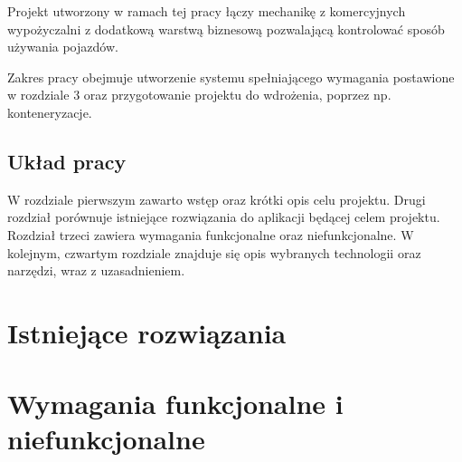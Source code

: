 \documentclass[eng,printmode,openany]{mgr}
\begin{document}
Projekt utworzony w ramach tej pracy łączy mechanikę z komercyjnych wypożyczalni z dodatkową warstwą biznesową pozwalającą kontrolować sposób używania pojazdów.

Zakres pracy obejmuje utworzenie systemu spełniającego wymagania postawione w rozdziale 3 oraz przygotowanie projektu do wdrożenia, poprzez np. konteneryzacje.

\section{Układ pracy}
W rozdziale pierwszym zawarto wstęp oraz krótki opis celu projektu. Drugi rozdział porównuje istniejące rozwiązania do aplikacji będącej celem projektu. Rozdział trzeci zawiera wymagania funkcjonalne oraz niefunkcjonalne. W kolejnym, czwartym rozdziale znajduje się opis wybranych technologii oraz narzędzi, wraz z uzasadnieniem. 

\newpage
\chapter{Istniejące rozwiązania}

\newpage
\chapter{Wymagania funkcjonalne i niefunkcjonalne}
\end{document}
